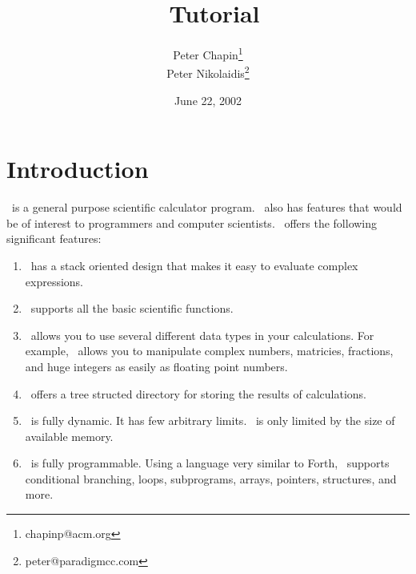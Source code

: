 \documentclass{report}
\begin{document}
\title{\CLAC\ Tutorial}
\author{Peter Chapin\thanks{chapinp@acm.org}\\
        Peter Nikolaidis\thanks{peter@paradigmcc.com}}
\date{June 22, 2002}
\maketitle

\tableofcontents
\newpage
{}

\chapter{Introduction}

\CLAC\ is a general purpose scientific calculator program. \CLAC\ also has features that would
be of interest to programmers and computer scientists. \CLAC\ offers the following significant
features:

\begin{enumerate}
  
\item \CLAC\ has a stack oriented design that makes it easy to evaluate complex expressions.
  
\item \CLAC\ supports all the basic scientific functions.
  
\item \CLAC\ allows you to use several different data types in your calculations. For example,
  \CLAC\ allows you to manipulate complex numbers, matricies, fractions, and huge integers as
  easily as floating point numbers.
  
\item \CLAC\ offers a tree structed directory for storing the results of calculations.
  
\item \CLAC\ is fully dynamic. It has few arbitrary limits. \CLAC\ is only limited by the size
  of available memory.
  
\item \CLAC\ is fully programmable. Using a language very similar to Forth, \CLAC\ supports
  conditional branching, loops, subprograms, arrays, pointers, structures, and more.

\end{enumerate}
\end{document}
